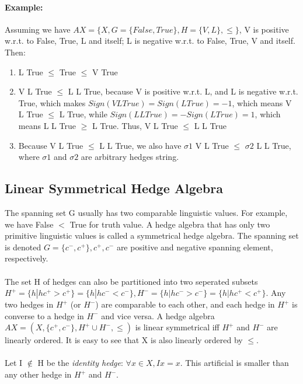 \documentclass[part1.tex]{subfiles}
\begin{document}
\paragraph{Example:} Assuming we have $AX = \{X, G =
\{False, True\}, H=\{V,L\}, \le\}$, V is positive w.r.t. to
False, True, L and itself; L is negative w.r.t. to
False, True, V and itself. Then:
\begin{enumerate}
        \item L True $\le$ True $\le$ V True
        \item V L True $\le$ L L True, because V is positive
                w.r.t. L, and L is negative w.r.t. True, which
                makes $Sign(V L True) = Sign(L True) = -1$, which
                means V L True $\le$ L True, while $Sign(L L
                True) = -Sign(L True) = 1$, which means L L True
                $\ge$ L True. Thus, V L True $\le$ L L True
        \item Because V L True $\le$ L L True, we also have $\sigma1$ 
                V L True $\le$ $\sigma2$ L L True, where
                $\sigma1$ and $\sigma2$ are arbitrary hedges
                string. 
\end{enumerate}


\subsection{Linear Symmetrical Hedge Algebra}
The spanning set G usually has two comparable linguistic values. For example, we have False \(<\) True
for truth value. A hedge algebra that has only two primitive linguistic values is called a symmetrical
hedge algebra. The spanning set is denoted \(G = \{c^-, c^+\}, c^+, c^-\) are positive and negative 
spanning element, respectively.\\\\

The set H of hedges can also be partitioned into two seperated subsets \(H^+ = \{h|hc^+ > c^+\} = 
\{h|hc^- < c^-\}, H^- = \{h|hc^- > c^-\} = 
\{h|hc^+ < c^+\}\). Any two hedges in \(H^+\) (or \(H^-\)) are comparable to each other, and each hedge in \(H^+\) is converse to a hedge in \(H^-\) and vice versa. A hedge algebra \(AX = (X,\{c^+,c^-\},H^+\cup
H^-, \le)\) is linear symmetrical iff \(H^+\) and \(H^-\) are linearly ordered. It is easy to see
that X is also linearly ordered by \(\le\).\\\\

Let I \(\notin\) H be the {\em identity hedge}: \(\forall x \in
X, Ix = x\). This artificial is smaller than any other
hedge in \(H^+\) and \(H^-\).\\\\
\end{document}
